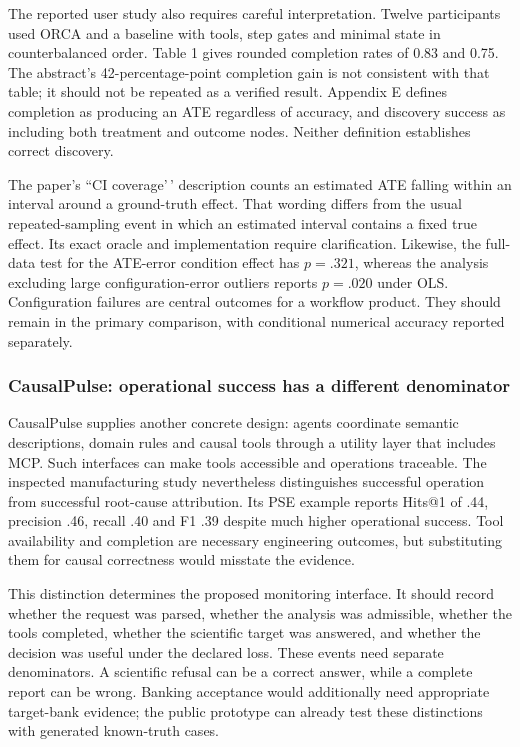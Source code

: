 The reported user study also requires careful interpretation. Twelve
participants used ORCA and a baseline with tools, step gates and minimal
state in counterbalanced order. Table 1 gives rounded completion rates
of 0.83 and 0.75. The abstract's 42-percentage-point completion gain is
not consistent with that table; it should not be repeated as a verified
result. Appendix E defines completion as producing an ATE regardless of
accuracy, and discovery success as including both treatment and outcome
nodes. Neither definition establishes correct discovery.
\citep{exec13_census_orca}

The paper's ``CI coverage'\,' description counts an estimated ATE
falling within an interval around a ground-truth effect. That wording
differs from the usual repeated-sampling event in which an estimated
interval contains a fixed true effect. Its exact oracle and
implementation require clarification. Likewise, the full-data test for
the ATE-error condition effect has \(p=.321\), whereas the analysis
excluding large configuration-error outliers reports \(p=.020\) under
OLS. Configuration failures are central outcomes for a workflow product.
They should remain in the primary comparison, with conditional numerical
accuracy reported separately.

\hypertarget{causalpulse-operational-success-has-a-different-denominator}{%
\subsubsection{CausalPulse: operational success has a different
denominator}\label{causalpulse-operational-success-has-a-different-denominator}}

CausalPulse supplies another concrete design: agents coordinate semantic
descriptions, domain rules and causal tools through a utility layer that
includes MCP. Such interfaces can make tools accessible and operations
traceable. The inspected manufacturing study nevertheless distinguishes
successful operation from successful root-cause attribution. Its PSE
example reports Hits@1 of .44, precision .46, recall .40 and F1 .39
despite much higher operational success. Tool availability and
completion are necessary engineering outcomes, but substituting them for
causal correctness would misstate the evidence. \citep{exec13_pulse}

This distinction determines the proposed monitoring interface. It should
record whether the request was parsed, whether the analysis was
admissible, whether the tools completed, whether the scientific target
was answered, and whether the decision was useful under the declared
loss. These events need separate denominators. A scientific refusal can
be a correct answer, while a complete report can be wrong. Banking
acceptance would additionally need appropriate target-bank evidence; the
public prototype can already test these distinctions with generated
known-truth cases.

